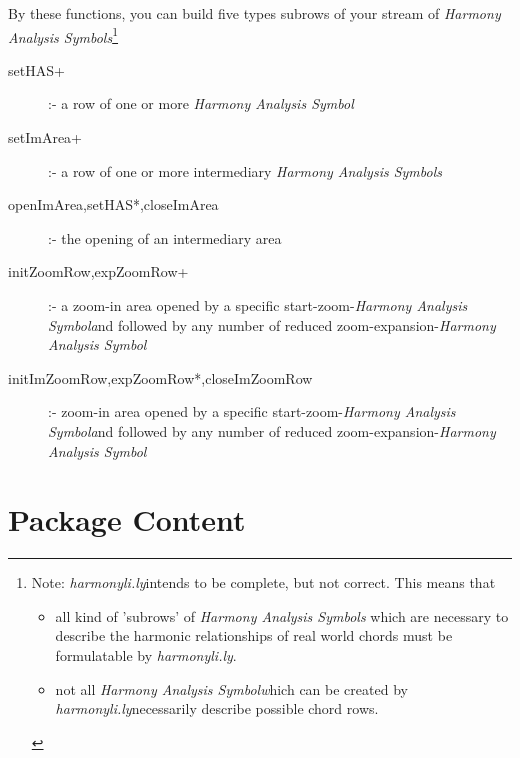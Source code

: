 \documentclass[
  DIV=calc,
  BCOR=5mm,
  12pt,
  headings=small,
  oneside,
  abstract=true,
  toc=bib,
  xcolor=dvipsnames,
  openany,
  ngerman,english]{scrartcl}
\newcommand{\hlyn}[0]{\textit{harmonyli.ly}}
\newcommand{\has}[1]{\textit{Harmony Analysis Symbol#1}}
\begin{document}
By these functions, you can build five types subrows of your stream of
\has{s}\footnote{Note: \hlyn intends to be complete, but not correct. This means
that 
\begin{itemize}
  \item all kind of 'subrows' of \has{s} which are necessary to describe the
  harmonic relationships of real world chords must be formulatable by \hlyn.
  \item not all \has which can be created by \hlyn necessarily describe
  possible chord rows.
\end{itemize}
}

\begin{description}
  \item[setHAS+] :- a row of one or more \has{}
  \item[setImArea+] :- a row of one or more intermediary \has{s}
  \item[openImArea,setHAS*,closeImArea] :- the opening of an intermediary area
    \item[initZoomRow,expZoomRow+] :- a zoom-in area opened by a specific
  start-zoom-\has and followed by any number of reduced zoom-expansion-\has{}
  \item[initImZoomRow,expZoomRow*,closeImZoomRow] :-  zoom-in area opened by a
  specific start-zoom-\has and followed by any number of reduced
  zoom-expansion-\has{}
\end{description}


\section{Package Content}
















%
\printnomenclature


\end{document}
